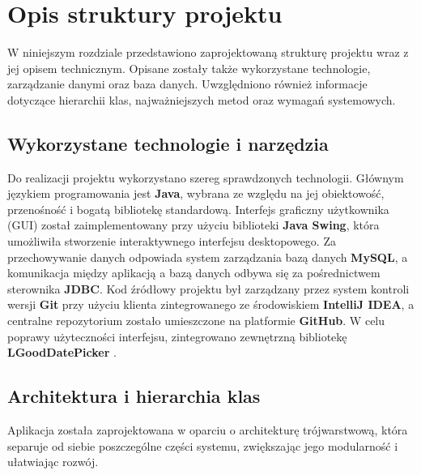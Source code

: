 

\chapter{Opis struktury projektu}
\label{chap:struktura_projektu}
W niniejszym rozdziale przedstawiono zaprojektowaną strukturę projektu wraz z jej opisem technicznym. Opisane zostały także wykorzystane technologie, zarządzanie danymi oraz baza danych. Uwzględniono również informacje dotyczące hierarchii klas, najważniejszych metod oraz wymagań systemowych.

\section{Wykorzystane technologie i narzędzia}
Do realizacji projektu wykorzystano szereg sprawdzonych technologii. Głównym językiem programowania jest \textbf{Java}, wybrana ze względu na jej obiektowość, przenośność i bogatą bibliotekę standardową. Interfejs graficzny użytkownika (GUI) został zaimplementowany przy użyciu biblioteki \textbf{Java Swing}, która umożliwiła stworzenie interaktywnego interfejsu desktopowego. Za przechowywanie danych odpowiada system zarządzania bazą danych \textbf{MySQL}, a komunikacja między aplikacją a bazą danych odbywa się za pośrednictwem sterownika \textbf{JDBC}. Kod źródłowy projektu był zarządzany przez system kontroli wersji \textbf{Git} przy użyciu klienta zintegrowanego ze środowiskiem \textbf{IntelliJ IDEA}, a centralne repozytorium zostało umieszczone na platformie \textbf{GitHub}. W celu poprawy użyteczności interfejsu, zintegrowano zewnętrzną bibliotekę \textbf{LGoodDatePicker} \cite{LGoodDatePicker}.

\section{Architektura i hierarchia klas}
Aplikacja została zaprojektowana w oparciu o architekturę trójwarstwową, która separuje od siebie poszczególne części systemu, zwiększając jego modularność i ułatwiając rozwój.

